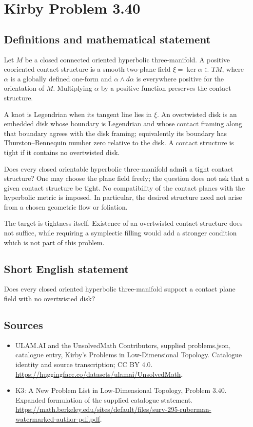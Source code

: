 \documentclass[11pt,a4paper]{article}
\begin{document}
\section*{Kirby Problem 3.40}\label{statement}

\subsection{Definitions and mathematical statement}
Let $M$ be a closed connected oriented hyperbolic three-manifold. A positive
cooriented contact structure is a smooth two-plane field
$\xi=\ker\alpha\subset TM$, where $\alpha$ is a globally defined one-form
and $\alpha\wedge d\alpha$ is everywhere positive for the orientation of $M$.
Multiplying $\alpha$ by a positive function preserves the contact structure.

A knot is Legendrian when its tangent line lies in $\xi$. An overtwisted
disk is an embedded disk whose boundary is Legendrian and whose contact
framing along that boundary agrees with the disk framing; equivalently its
boundary has Thurston--Bennequin number zero relative to the disk.
A contact structure is tight if it contains no overtwisted disk.

Does every closed orientable hyperbolic three-manifold admit a tight contact
structure? One may choose the plane field freely; the question does not
ask that a given contact structure be tight. No compatibility of the contact
planes with the hyperbolic metric is imposed. In particular, the desired
structure need not arise from a chosen geometric flow or foliation.

The target is tightness itself. Existence of an overtwisted contact structure
does not suffice, while requiring a symplectic filling would add a stronger
condition which is not part of this problem.
\subsection{Short English statement}
Does every closed oriented hyperbolic three-manifold support a contact plane field with no overtwisted disk?
\subsection{Sources}
\begin{itemize}
\item[S1] ULAM.AI and the UnsolvedMath Contributors, supplied problems.json, catalogue entry, Kirby's Problems in Low-Dimensional Topology. Catalogue identity and source transcription; CC BY 4.0.
\url{https://huggingface.co/datasets/ulamai/UnsolvedMath}.
\item[S2] K3: A New Problem List in Low-Dimensional Topology, Problem 3.40. Expanded formulation of the supplied catalogue statement.
\url{https://math.berkeley.edu/sites/default/files/surv-295-ruberman-watermarked-author-pdf.pdf}.
\end{itemize}
\end{document}
